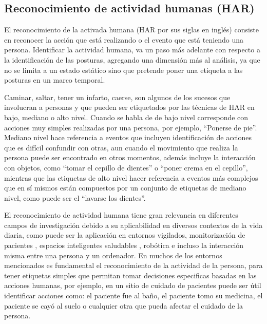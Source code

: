      
    \subsection{Reconocimiento de actividad humanas (HAR)}
    \label{sub:FrameHAR}
        
        El reconocimiento de la activada humana (HAR por sus siglas en inglés) consiste en reconocer la acción que está realizando o el evento que está teniendo una persona. Identificar la actividad humana, va un paso más adelante con respecto a la identificación de las posturas, agregando una dimensión más al análisis, ya que no se limita a un estado estático sino que pretende poner una etiqueta a las posturas en un marco temporal. 
        
        Caminar, saltar, tener un infarto, caerse, son algunos de los sucesos que involucran a personas y que pueden ser etiquetados por las técnicas de HAR en bajo, mediano o alto nivel. Cuando se habla de de bajo nivel corresponde con acciones muy simples realizadas por una persona, por ejemplo, ``Ponerse de pie''. Mediano nivel hace referencia a eventos que incluyen identificación de acciones que es difícil confundir con otras, aun cuando el movimiento que realiza la persona puede ser encontrado en otros momentos, además incluye la interacción con objetos, como ``tomar el cepillo de dientes'' o ``poner crema en el cepillo'', mientras que las etiquetas de alto nivel hacer referencia a eventos más complejos que en sí mismos están compuestos por un conjunto de etiquetas de mediano nivel, como puede ser el ``lavarse los dientes''.
        
        El reconocimiento de actividad humana tiene gran relevancia en diferentes campos de investigación debido a su aplicabilidad en diversos contextos de la vida diaria, como puede ser la aplicación en entornos vigilados, monitorización de pacientes \cite{Cho2009Parkinson}, espacios inteligentes saludables \cite{Akula2018HarCnn, Nweke2019, mehr2019HarCnn}, robótica e incluso la interacción misma entre una persona y un ordenador. En muchos de los entornos mencionados es fundamental el reconocimiento de la actividad de la persona, para tener etiquetas simples que permitan tomar decisiones especificas basadas en las acciones humanas, por ejemplo, en un sitio de cuidado de pacientes puede ser útil identificar acciones como: el paciente fue al baño, el paciente tomo su medicina, el paciente se cayó al suelo o cualquier otra que pueda afectar el cuidado de la persona.
        
